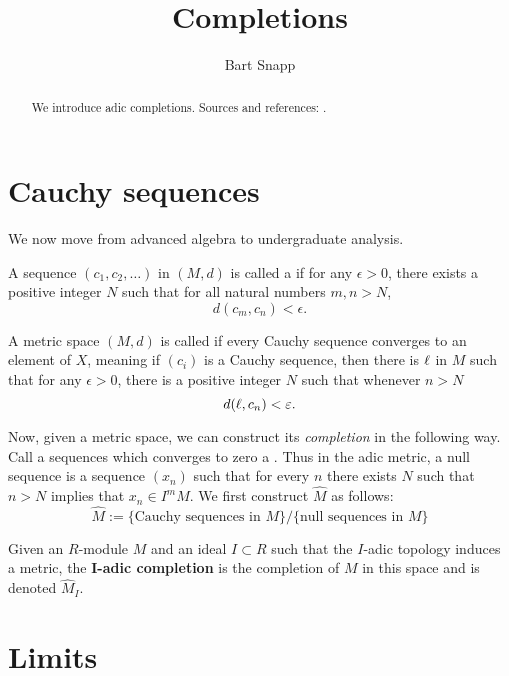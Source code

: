 \documentclass{ximera}
\author{Bart Snapp}
\title{Completions}
\begin{document}
\begin{abstract}
  We introduce adic completions. Sources and references:
  \cite{AK2012,AM1969,sD2008}.
\end{abstract}
\maketitle



\section{Cauchy sequences}


We now move from advanced algebra to undergraduate analysis.



\begin{definition}
  A sequence $(c_1,c_2,\dots)$ in $(M,d)$ is called a  if for any $\epsilon>0$, there exists a positive integer
  $N$ such that for all natural numbers $m,n>N$,
  \[
  d(c_m,c_n) < \epsilon.
  \]
\end{definition}

\begin{definition}
  A metric space $(M,d)$ is called  if every Cauchy
  sequence converges to an element of $X$, meaning if $(c_i)$ is a
  Cauchy sequence, then there is $\ell$ in $M$ such that for any
  $\epsilon>0$, there is a positive integer $N$ such that whenever $n>N$
  \[
  d(\ell,c_n) < \varepsilon.
  \]
\end{definition}

Now, given a metric space, we can construct its \textit{completion} in
the following way. Call a sequences which converges to zero a
. Thus in the adic metric, a
null sequence is a sequence $(x_n)$ such that for every $n$ there
exists $N$ such that $n > N$ implies that $x_n \in I^mM$.  We first
construct $\hat{M}$ as follows:
\[
\hat{M} := \{\text{Cauchy sequences in $M$}\}/\{\text{null sequences in $M$}\}
\]

\begin{definition}
  Given an $R$-module $M$ and an ideal $I\subset R$ such that the
  $I$-adic topology induces a metric, the
  \textbf{$\boldsymbol{I}$-adic completion} is the completion of $M$
  in this space and is denoted $\hat{M}_I$.
\end{definition}



\section{Limits}
\end{document}
